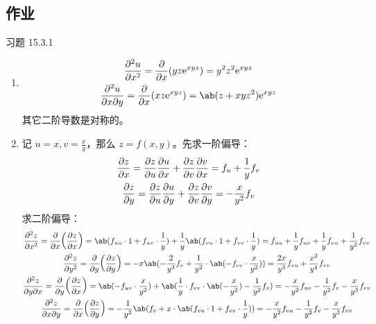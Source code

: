 \subsection{作业}

\begin{problem}
    习题 15.3.1
    \begin{solution}
        \begin{enumerate}
            \item[\textbf{2)}]
            $$
            \begin{gathered}
                \pdv[2]{u}{x} = \pdv{x}(y z \E^{x y z}) = y^2 z^2 \E^{x y z} \\
                \pdv[2]{u}{x}{y} = \pdv{x}(x z \E^{x y z}) = \ab(z + x y z^2) \E^{x y z}
            \end{gathered}
            $$
            其它二阶导数是对称的。

            \item[\textbf{3)}] 记 $u = x, v = \frac{x}{y}$，那么 $z = f(x, y)$。先求一阶偏导：
            $$
            \begin{gathered}
                \pdv{z}{x} = \pdv{z}{u} \pdv{u}{x} + \pdv{z}{v} \pdv{v}{x} = f_u + \frac{1}{y} f_v \\
                \pdv{z}{y} = \pdv{z}{u} \pdv{u}{y} + \pdv{z}{v} \pdv{v}{y} = -\frac{x}{y^2} f_v
            \end{gathered}
            $$
            求二阶偏导：
            $$
            \begin{gathered}
                \pdv[2]{z}{x} = \pdv{x}(\pdv{z}{x}) = \ab(f_{uu} \cdot 1 + f_{uv} \cdot \frac{1}{y}) + \frac{1}{y} \ab(f_{vu} \cdot 1 + f_{vv} \cdot \frac{1}{y}) = f_{uu} + \frac{1}{y} f_{uv} + \frac{1}{y} f_{vu} + \frac{1}{y^2} f_{vv} \\
                \pdv[2]{z}{y} = \pdv{y}(\pdv{z}{y}) = -x \ab(-\frac{2}{y^3} f_v + \frac{1}{y^2} \cdot \ab(-f_{vv} \cdot \frac{x}{y^2})) = \frac{2x}{y^3} f_{vu} + \frac{x^2}{y^4} f_{vv} \\
                \pdv[2]{z}{y}{x} = \pdv{y}(\pdv{z}{x}) = \ab(-f_{uv} \cdot \frac{x}{y^2}) + \ab(\frac{1}{y} \cdot f_{vv} \cdot \ab(-\frac{x}{y^2}) - \frac{1}{y^2} f_v) = -\frac{x}{y^2} f_{uv} - \frac{1}{y^2} f_v - \frac{x}{y^3} f_{vv} \\
                \pdv[2]{z}{x}{y} = \pdv{x}(\pdv{z}{y}) = -\frac{1}{y^2} \ab(f_v + x \cdot \ab(f_{vu} \cdot 1 + f_{vv} \cdot \frac{1}{y})) = -\frac{x}{y^2} f_{vu} - \frac{1}{y^2} f_v - \frac{x}{y^3} f_{vv}
            \end{gathered}
            $$


\end{enumerate}
\end{solution}
\end{problem}
